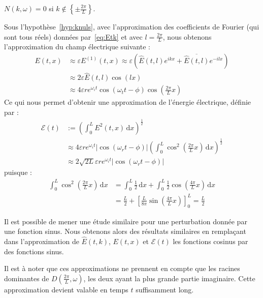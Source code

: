 \begin{hyp}
  $N(k,\omega) = 0$ si $k\notin\left\{\pm\frac{2\pi}{L}\right\}$.
  \label{hyp:knuls}
\end{hyp}
Sous l'hypothèse~\ref{hyp:knuls}, avec l'approximation des coefficients de Fourier (qui sont tous réels) données par~\eqref{eq:Etk} et avec $l=\frac{2\pi}{L}$, nous obtenons l'approximation du champ électrique suivante :
$$
  \begin{aligned}
    E(t,x) &\approx \varepsilon E^{(1)}(t,x) \approx \varepsilon\left( \hat{E}(t,l)e^{ikx} + \overline{\hat{E}(t,l)}e^{-ilx} \right) \\
           &\approx 2\varepsilon \hat{E}(t,l)\cos(lx) \\
           &\approx 4\varepsilon r e^{\omega_i t}\cos(\omega_t t -\phi)\cos\left(\frac{2\pi}{L}x\right)
  \end{aligned}
$$
Ce qui nous permet d'obtenir une approximation de l'énergie électrique, définie par :
\begin{equation}
  \begin{aligned}
    \mathcal{E}(t) & := \left( \int_0^L E^2(t,x)\,\mathrm{d}x \right)^{\frac{1}{2}} \\
                   & \approx 4\varepsilon r e^{\omega_i t}\left|\cos(\omega_rt - \phi)\right|\left( \int_0^L \cos^2\left(\frac{2\pi}{L}x\right)\,\mathrm{d}x \right)^{\frac{1}{2}} \\
                   & \approx 2\sqrt{2L}\varepsilon r e^{\omega_i t}\left|\cos(\omega_rt - \phi)\right|
  \end{aligned}
\label{eq:enelec}\end{equation}
puisque :
$$
  \begin{aligned}
    \int_0^L \cos^2\left(\frac{2\pi}{L}x\right)\,\mathrm{d}x
      & = \int_0^L\frac{1}{2}\,\mathrm{d}x + \int_0^L\frac{1}{2}\cos\left(\frac{4\pi}{L}x\right)\,\mathrm{d}x \\
      & = \frac{L}{2} + \left[ \frac{L}{8\pi}\sin\left(\frac{4\pi}{L}x\right)\right]_0^L = \frac{L}{2}
  \end{aligned}
$$

\begin{remark}
  Il est possible de mener une étude similaire pour une perturbation donnée par une fonction sinus. Nous obtenons alors des résultats similaires en remplaçant dans l'approximation de $\hat{E}(t,k)$, $E(t,x)$ et $\mathcal{E}(t)$ les fonctions cosinus par des fonctions sinus.
\end{remark}

Il est à noter que ces approximations ne prennent en compte que les racines dominantes de $D(\frac{2\pi}{L},\omega)$, les deux ayant la plus grande partie imaginaire. Cette approximation devient valable en temps $t$ suffisamment long.

